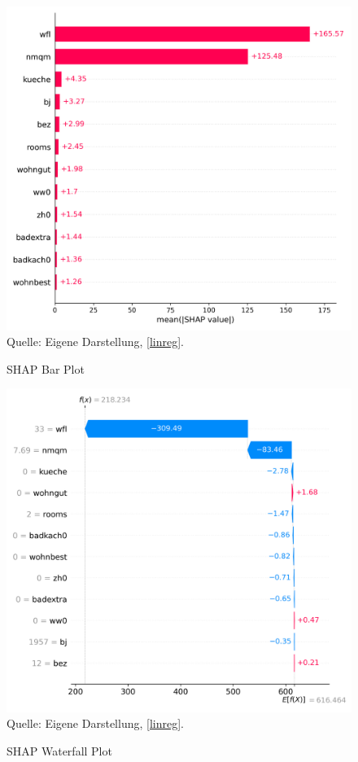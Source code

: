 \begin{figure}[h]
    \caption{SHAP Bar Plot}
    \includegraphics[width=1\textwidth]{../scripts/images/shap_bar_plot.png}
    Quelle: Eigene Darstellung, \ref{linreg}.
    \label{pic:shap_bar}
\end{figure}

\begin{figure}[h]
    \caption{SHAP Waterfall Plot}
    \includegraphics[width=1\textwidth]{../scripts/images/shap_waterfall_plot.png}
    Quelle: Eigene Darstellung, \ref{linreg}.
    \label{pic:shap_waterfall}
\end{figure}